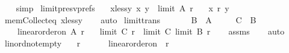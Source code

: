 \begin{isabellebody}
\ \ \isamarkupfalse%
\ simp%
\endisatagproof
{\isafoldproof}%
%
\isadelimproof
\isanewline
%
\endisadelimproof
\isanewline
{}\isamarkupfalse%
\ limit{\isacharunderscore}{\kern0pt}presv{\isacharunderscore}{\kern0pt}prefs{}{\isacharcolon}{\kern0pt}\isanewline
\ \ \ x{\isacharunderscore}{\kern0pt}less{\isacharunderscore}{\kern0pt}y{\isacharcolon}{\kern0pt}\ {\isachardoublequoteopen}{\isacharparenleft}{\kern0pt}x{\isacharcomma}{\kern0pt}\ y{\isacharparenright}{\kern0pt}\ {\isasymin}\ limit\ A\ r{\isachardoublequoteclose}\isanewline
\ \ \ {\isachardoublequoteopen}x\ {\isasympreceq}\isactrlsub r\ y{\isachardoublequoteclose}\isanewline
%
\isadelimproof
\ \ %
\endisadelimproof
%
\isatagproof
{}\isamarkupfalse%
\ mem{\isacharunderscore}{\kern0pt}Collect{\isacharunderscore}{\kern0pt}eq\ x{\isacharunderscore}{\kern0pt}less{\isacharunderscore}{\kern0pt}y\isanewline
\ \ \isamarkupfalse%
\ auto%
\endisatagproof
{\isafoldproof}%
%
\isadelimproof
\isanewline
%
\endisadelimproof
\isanewline
{}\isamarkupfalse%
\ limit{\isacharunderscore}{\kern0pt}trans{\isacharcolon}{\kern0pt}\isanewline
\ \ \isanewline
\ \ \ \ {\isachardoublequoteopen}B\ {\isasymsubseteq}\ A{\isachardoublequoteclose}\ \isanewline
\ \ \ \ {\isachardoublequoteopen}C\ {\isasymsubseteq}\ B{\isachardoublequoteclose}\ \isanewline
\ \ \ \ {\isachardoublequoteopen}linear{\isacharunderscore}{\kern0pt}order{\isacharunderscore}{\kern0pt}on\ A\ r{\isachardoublequoteclose}\isanewline
\ \ \ {\isachardoublequoteopen}limit\ C\ r\ {\isacharequal}{\kern0pt}\ limit\ C\ {\isacharparenleft}{\kern0pt}limit\ B\ r{\isacharparenright}{\kern0pt}{\isachardoublequoteclose}\isanewline
%
\isadelimproof
\ \ %
\endisadelimproof
%
\isatagproof
{}\isamarkupfalse%
\ assms\isanewline
\ \ \isamarkupfalse%
\ auto%
\endisatagproof
{\isafoldproof}%
%
\isadelimproof
\isanewline
%
\endisadelimproof
\isanewline
{}\isamarkupfalse%
\ lin{\isacharunderscore}{\kern0pt}ord{\isacharunderscore}{\kern0pt}not{\isacharunderscore}{\kern0pt}empty{\isacharcolon}{\kern0pt}\isanewline
\ \ \ {\isachardoublequoteopen}r\ {\isasymnoteq}\ {\isacharbraceleft}{\kern0pt}{\isacharbraceright}{\kern0pt}{\isachardoublequoteclose}\isanewline
\ \ \ {\isachardoublequoteopen}{\isasymnot}\ linear{\isacharunderscore}{\kern0pt}order{\isacharunderscore}{\kern0pt}on\ {\isacharbraceleft}{\kern0pt}{\isacharbraceright}{\kern0pt}\ r{\isachardoublequoteclose}\isanewline

\end{isabellebody}
